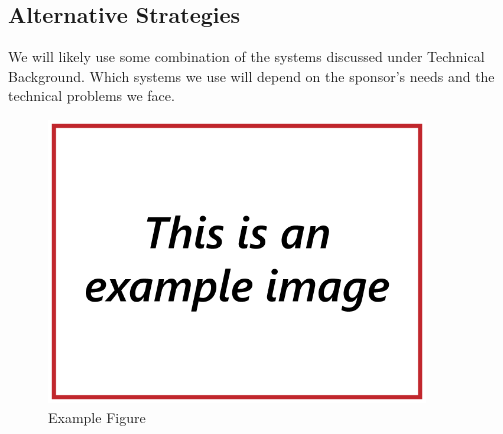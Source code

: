 \subsection{\label{sec:intro:alternatives}Alternative Strategies}
We will likely use some combination of the systems discussed under Technical Background.  Which systems we use will depend on the sponsor's needs and the technical problems we face.

\begin{figure}
\includegraphics[width=100mm,natwidth=640,natheight=480]{"./image/Example"}
\caption{\label{fig:example}Example Figure}
\end{figure}
